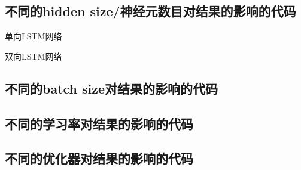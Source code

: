 \documentclass[addpoints,answers]{exam}
\begin{document}
\subsection{不同的hidden size/神经元数目对结果的影响的代码}
单向LSTM网络

双向LSTM网络

\subsection{不同的batch size对结果的影响的代码}

\subsection{不同的学习率对结果的影响的代码}

\subsection{不同的优化器对结果的影响的代码}

\end{document}
